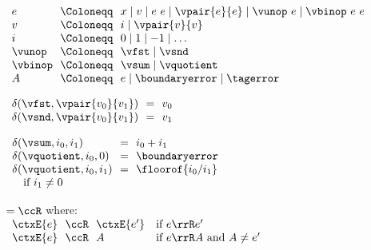 \begin{flushleft}

\\
$\begin{array}{l@{~~}c@{~~}l}
  e & \Coloneqq & x \mid v \mid e~e \mid \vpair{e}{e} \mid \vunop~e \mid \vbinop~e~e
\\
  v & \Coloneqq & i \mid \vpair{v}{v}
\\
  i & \Coloneqq & 0 \mid 1 \mid -1 \mid \ldots
\\
  \vunop & \Coloneqq & \vfst \mid \vsnd
\\
  \vbinop & \Coloneqq & \vsum \mid \vquotient
\\
  A & \Coloneqq & e \mid \boundaryerror \mid \tagerror
\end{array}$

\medskip
\begin{minipage}[t]{0.38\columnwidth}
$\begin{array}{l@{~~}c@{~~}l}
  \delta(\vfst, \vpair{v_0}{v_1}) & = & v_0
\\
  \delta(\vsnd, \vpair{v_0}{v_1}) & = & v_1
\end{array}$
\end{minipage}%
\begin{minipage}[t]{0.5\columnwidth}
$\begin{array}{l@{~~}c@{~~}l}
  \delta(\vsum, i_0, i_1) & = & i_0 + i_1
\\
  \delta(\vquotient, i_0, 0) & = & \boundaryerror
\\
  \delta(\vquotient, i_0, i_1) & = & \floorof{i_0 / i_1}
\\ \multicolumn{3}{l}{\mbox{\quad if $i_1 \neq 0$}}
\end{array}$
\end{minipage}

 $= \ccR$ where:\\
$\begin{array}{l@{~~}c@{~~}l l}
\ctxE{e} & \ccR & \ctxE{e'} & \mbox{if $e \rrR e'$}
\\
\ctxE{e} & \ccR & A         & \mbox{if $e \rrR A$ and $A \neq e'$}
\end{array}$

\end{flushleft}
